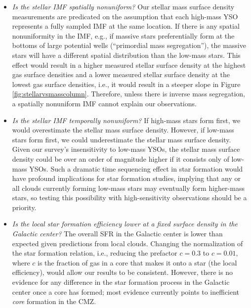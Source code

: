 \documentclass[twocolumn]{aastex61}
\begin{document}
\begin{itemize}
    \item \emph{Is the stellar IMF spatially nonuniform?}
        Our stellar mass surface density measurements are predicated on the
        assumption that each high-mass YSO represents a fully sampled IMF at
        the same location.  If there is any spatial nonuniformity in the IMF,
        e.g., if massive stars preferentially form at the bottoms
        of large potential wells (``primordial mass segregation''), the massive
        stars will have a different spatial distribution than the low-mass
        stars.  This effect would result in a higher measured stellar surface
        density at the highest gas surface densities and a lower measured
        stellar surface density at the lowest gas surface densities, i.e., it
        would result in a steeper slope in Figure
        \ref{fig:stellarvsmasscolumn}.  Therefore, unless there is inverse mass
        segregation, a spatially nonuniform IMF cannot explain our
        observations.

    \item \emph{Is the stellar IMF temporally nonuniform?}
        If high-mass stars form first, we would overestimate the stellar mass
        surface density.  However, if low-mass stars form first, we could
        underestimate the stellar mass surface density.  Given our survey's
        insensitivity to low-mass YSOs, the stellar mass surface density could
        be over an order of magnitude higher if it consists only of low-mass
        YSOs.  Such a dramatic time sequencing effect in star formation
        would have profound implications for star formation studies, implying
        that any or all clouds currently forming low-mass stars may eventually
        form higher-mass stars, so testing this possibility with
        high-sensitivity observations should be a priority.

    \item \emph{Is the \emph{local} star formation efficiency lower at a fixed surface
        density in the Galactic center?}
        The overall SFR in the Galactic center is lower than
        expected given predictions from local clouds.  Changing the
        normalization of the star formation relation, i.e., reducing the prefactor
        $c=0.3$ to $c=0.01$, where $c$ is the fraction of gas in a core that
        makes it onto a star (the local efficiency), would allow our results to
        be consistent.  However, there is no evidence for any difference in the
        star formation process in the Galactic center once a core has formed;
        most evidence currently points to inefficient \emph{core} formation in
        the CMZ.


\end{itemize}
\end{document}
